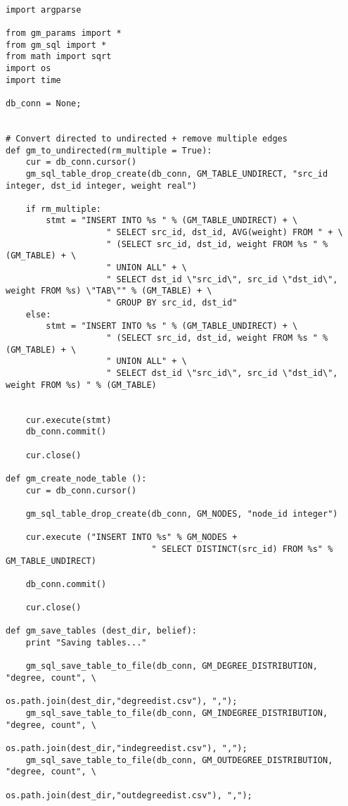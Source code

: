 \begin{lstlisting}

import argparse

from gm_params import *
from gm_sql import *
from math import sqrt
import os
import time

db_conn = None;


# Convert directed to undirected + remove multiple edges
def gm_to_undirected(rm_multiple = True):
    cur = db_conn.cursor()
    gm_sql_table_drop_create(db_conn, GM_TABLE_UNDIRECT, "src_id integer, dst_id integer, weight real")

    if rm_multiple:
        stmt = "INSERT INTO %s " % (GM_TABLE_UNDIRECT) + \
                    " SELECT src_id, dst_id, AVG(weight) FROM " + \
                    " (SELECT src_id, dst_id, weight FROM %s " % (GM_TABLE) + \
                    " UNION ALL" + \
                    " SELECT dst_id \"src_id\", src_id \"dst_id\", weight FROM %s) \"TAB\"" % (GM_TABLE) + \
                    " GROUP BY src_id, dst_id"
    else:
        stmt = "INSERT INTO %s " % (GM_TABLE_UNDIRECT) + \
                    " (SELECT src_id, dst_id, weight FROM %s " % (GM_TABLE) + \
                    " UNION ALL" + \
                    " SELECT dst_id \"src_id\", src_id \"dst_id\", weight FROM %s) " % (GM_TABLE)


    cur.execute(stmt)
    db_conn.commit()

    cur.close()

def gm_create_node_table ():
    cur = db_conn.cursor()

    gm_sql_table_drop_create(db_conn, GM_NODES, "node_id integer")

    cur.execute ("INSERT INTO %s" % GM_NODES +
                             " SELECT DISTINCT(src_id) FROM %s" % GM_TABLE_UNDIRECT)

    db_conn.commit()

    cur.close()

def gm_save_tables (dest_dir, belief):
    print "Saving tables..."

    gm_sql_save_table_to_file(db_conn, GM_DEGREE_DISTRIBUTION, "degree, count", \
                                  os.path.join(dest_dir,"degreedist.csv"), ",");
    gm_sql_save_table_to_file(db_conn, GM_INDEGREE_DISTRIBUTION, "degree, count", \
                                  os.path.join(dest_dir,"indegreedist.csv"), ",");
    gm_sql_save_table_to_file(db_conn, GM_OUTDEGREE_DISTRIBUTION, "degree, count", \
                                  os.path.join(dest_dir,"outdegreedist.csv"), ",");


\end{lstlisting}
